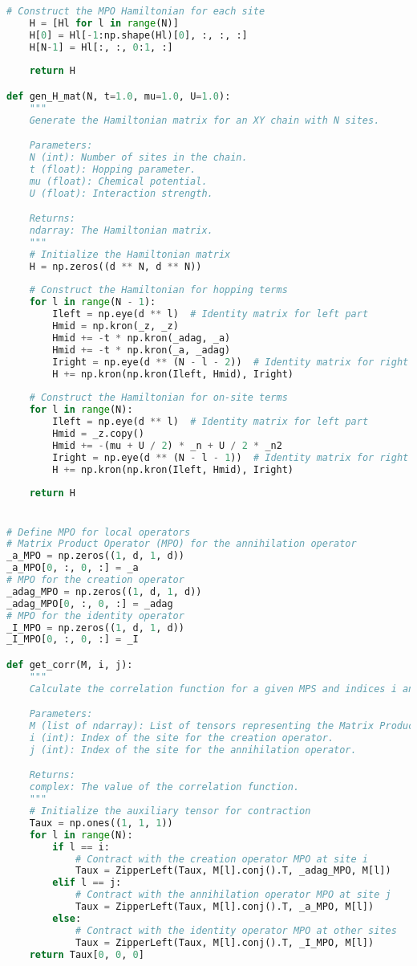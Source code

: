 \begin{widetext}
\begin{lstlisting}[language=Python]
    # Construct the MPO Hamiltonian for each site
    H = [Hl for l in range(N)]
    H[0] = Hl[-1:np.shape(Hl)[0], :, :, :]
    H[N-1] = Hl[:, :, 0:1, :]
    
    return H

def gen_H_mat(N, t=1.0, mu=1.0, U=1.0):
    """
    Generate the Hamiltonian matrix for an XY chain with N sites.

    Parameters:
    N (int): Number of sites in the chain.
    t (float): Hopping parameter.
    mu (float): Chemical potential.
    U (float): Interaction strength.

    Returns:
    ndarray: The Hamiltonian matrix.
    """
    # Initialize the Hamiltonian matrix
    H = np.zeros((d ** N, d ** N))
    
    # Construct the Hamiltonian for hopping terms
    for l in range(N - 1):
        Ileft = np.eye(d ** l)  # Identity matrix for left part
        Hmid = np.kron(_z, _z)
        Hmid += -t * np.kron(_adag, _a)
        Hmid += -t * np.kron(_a, _adag)
        Iright = np.eye(d ** (N - l - 2))  # Identity matrix for right part
        H += np.kron(np.kron(Ileft, Hmid), Iright)
    
    # Construct the Hamiltonian for on-site terms
    for l in range(N):
        Ileft = np.eye(d ** l)  # Identity matrix for left part
        Hmid = _z.copy()
        Hmid += -(mu + U / 2) * _n + U / 2 * _n2
        Iright = np.eye(d ** (N - l - 1))  # Identity matrix for right part
        H += np.kron(np.kron(Ileft, Hmid), Iright)
    
    return H


# Define MPO for local operators
# Matrix Product Operator (MPO) for the annihilation operator
_a_MPO = np.zeros((1, d, 1, d))
_a_MPO[0, :, 0, :] = _a
# MPO for the creation operator
_adag_MPO = np.zeros((1, d, 1, d))
_adag_MPO[0, :, 0, :] = _adag
# MPO for the identity operator
_I_MPO = np.zeros((1, d, 1, d))
_I_MPO[0, :, 0, :] = _I

def get_corr(M, i, j):
    """
    Calculate the correlation function for a given MPS and indices i and j.

    Parameters:
    M (list of ndarray): List of tensors representing the Matrix Product State (MPS).
    i (int): Index of the site for the creation operator.
    j (int): Index of the site for the annihilation operator.

    Returns:
    complex: The value of the correlation function.
    """
    # Initialize the auxiliary tensor for contraction
    Taux = np.ones((1, 1, 1))
    for l in range(N):
        if l == i:
            # Contract with the creation operator MPO at site i
            Taux = ZipperLeft(Taux, M[l].conj().T, _adag_MPO, M[l])
        elif l == j:
            # Contract with the annihilation operator MPO at site j
            Taux = ZipperLeft(Taux, M[l].conj().T, _a_MPO, M[l])
        else:
            # Contract with the identity operator MPO at other sites
            Taux = ZipperLeft(Taux, M[l].conj().T, _I_MPO, M[l])
    return Taux[0, 0, 0]
\end{lstlisting}
\end{widetext}
